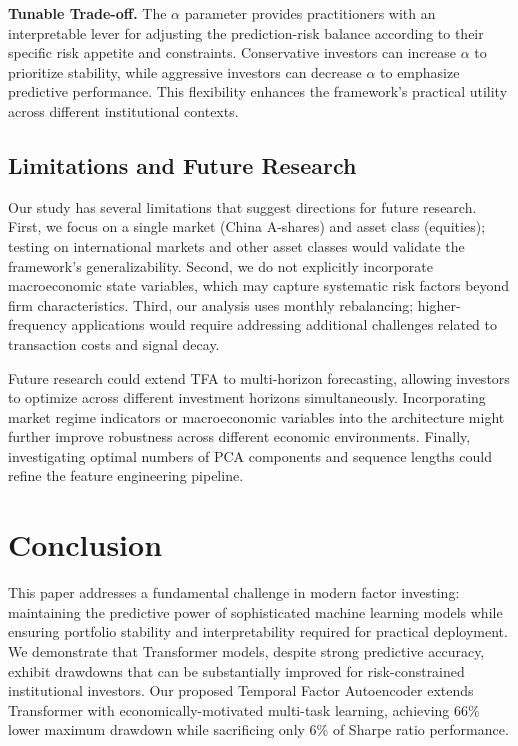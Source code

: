 \documentclass[12pt]{article}
\begin{document}
\textbf{Tunable Trade-off.} The $\alpha$ parameter provides practitioners with an interpretable lever for adjusting the prediction-risk balance according to their specific risk appetite and constraints. Conservative investors can increase $\alpha$ to prioritize stability, while aggressive investors can decrease $\alpha$ to emphasize predictive performance. This flexibility enhances the framework's practical utility across different institutional contexts.

\subsection{Limitations and Future Research}

Our study has several limitations that suggest directions for future research. First, we focus on a single market (China A-shares) and asset class (equities); testing on international markets and other asset classes would validate the framework's generalizability. Second, we do not explicitly incorporate macroeconomic state variables, which may capture systematic risk factors beyond firm characteristics. Third, our analysis uses monthly rebalancing; higher-frequency applications would require addressing additional challenges related to transaction costs and signal decay.

Future research could extend TFA to multi-horizon forecasting, allowing investors to optimize across different investment horizons simultaneously. Incorporating market regime indicators or macroeconomic variables into the architecture might further improve robustness across different economic environments. Finally, investigating optimal numbers of PCA components and sequence lengths could refine the feature engineering pipeline.

\section{Conclusion}

This paper addresses a fundamental challenge in modern factor investing: maintaining the predictive power of sophisticated machine learning models while ensuring portfolio stability and interpretability required for practical deployment. We demonstrate that Transformer models, despite strong predictive accuracy, exhibit drawdowns that can be substantially improved for risk-constrained institutional investors. Our proposed Temporal Factor Autoencoder extends Transformer with economically-motivated multi-task learning, achieving 66\% lower maximum drawdown while sacrificing only 6\% of Sharpe ratio performance.
\end{document}
